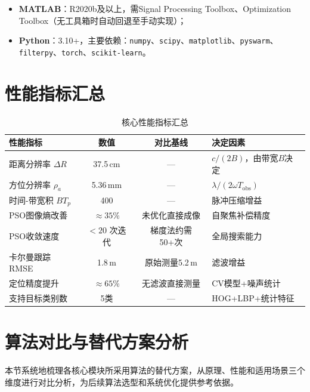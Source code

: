 \documentclass[12pt, a4paper]{article}
\begin{document}
\begin{itemize}
  \item \textbf{MATLAB}：R2020b及以上，需Signal Processing Toolbox、Optimization Toolbox（无工具箱时自动回退至手动实现）；
  \item \textbf{Python}：3.10+，主要依赖：\texttt{numpy}、\texttt{scipy}、\texttt{matplotlib}、\texttt{pyswarm}、\texttt{filterpy}、\texttt{torch}、\texttt{scikit-learn}。
\end{itemize}

\section{性能指标汇总}

\begin{table}[H]
\centering
\begin{tabularx}{\textwidth}{lCCL}
\toprule
{}\color{white}\bfseries 性能指标 &
  \color{white}\bfseries 数值 &
  \color{white}\bfseries 对比基线 &
  \color{white}\bfseries 决定因素 \\
\midrule
距离分辨率 $\Delta R$ & 37.5\,cm & --- & $c/(2B)$，由带宽$B$决定 \\
方位分辨率 $\rho_a$ & 5.36\,mm & --- & $\lambda/(2\omega T_\mathrm{obs})$ \\
时间-带宽积 $BT_p$ & 400 & --- & 脉冲压缩增益 \\
PSO图像熵改善 & $\approx 35\%$ & 未优化直接成像 & 自聚焦补偿精度 \\
PSO收敛速度 & $<20$ 次迭代 & 梯度法约需50+次 & 全局搜索能力 \\
卡尔曼跟踪RMSE & 1.8\,m & 原始测量5.2\,m & 滤波增益 \\
定位精度提升 & $\approx 65\%$ & 无滤波直接测量 & CV模型+噪声统计 \\
支持目标类别数 & 5类 & --- & HOG+LBP+统计特征 \\
\bottomrule
\end{tabularx}
\caption{核心性能指标汇总}
\label{tab:performance}
\end{table}

\section{算法对比与替代方案分析}
\label{sec:algorithm_comparison}

本节系统地梳理各核心模块所采用算法的替代方案，从原理、性能和适用场景三个维度进行对比分析，为后续算法选型和系统优化提供参考依据。
\end{document}
